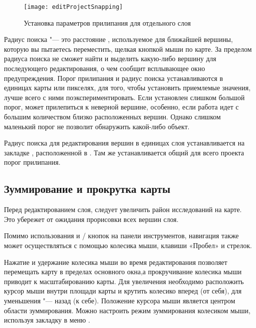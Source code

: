 \begin{figure}[ht]
   \centering
   \texttt{[image: editProjectSnapping]}
   \caption{Установка параметров прилипания для отдельного слоя \nixcaption}\label{fig:snappingoptions}
\end{figure}


Радиус поиска "--- это расстояние \qg , используемое для 
ближайшей вершины, которую вы пытаетесь переместить, щелкая кнопкой мыши
по карте. За пределом радиуса поиска \qg не сможет найти и выделить
какую-либо вершину для последующего редактирования, о чем сообщит
всплывающее окно предупреждения. Порог прилипания и радиус поиска
устанавливаются в единицах карты или пикселях, для того, чтобы установить
приемлемые значения, лучше всего с ними поэкспериментировать. Если установлен
слишком большой порог, \qg может прилепиться к неверной вершине, особенно,
если работа идет с большим количеством близко расположенных вершин. Однако
слишком маленький порог не позволит обнаружить какой-либо объект.

Радиус поиска для редактирования вершин в единицах слоя устанавливается
на закладке , расположенной в  \arrow
{}. Там же устанавливается общий
для всего проекта порог прилипания.

\subsection{Зуммирование и прокрутка карты}

Перед редактированием слоя, следует увеличить район исследований на карте.
Это убережет от ожидания прорисовки всех вершин слоя.

Помимо использования  и
/
кнопок на панели инструментов, навигация также может осуществляться с
помощью колесика мыши, клавиши «Пробел» и стрелок.


Нажатие и удержание колесика мыши во время редактирования позволяет перемещать
карту в пределах основного окна,а прокручивание колесика мыши приводит к
масштабированию карты. Для увеличения необходимо расположить курсор мыши внутри
площади карты и крутить колесико вперед (от себя), для уменьшения "--- назад
(к себе). Положение курсора мыши является центром области зуммирования. Можно
настроить режим зуммирования колесиком мыши, используя  закладку
 в меню  \arrow {}.

